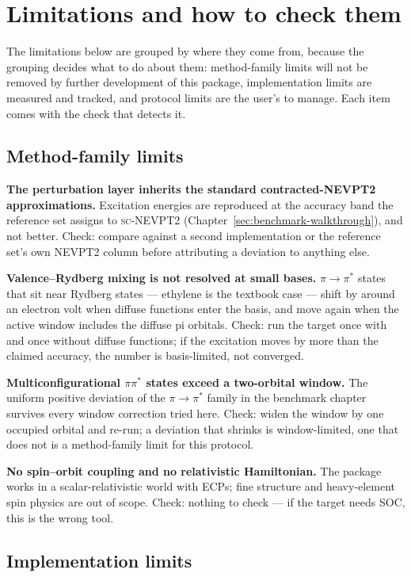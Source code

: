 \section{Limitations and how to check them}
\label{sec:limitations}

The limitations below are grouped by where they come from, because the
grouping decides what to do about them: method-family limits will not
be removed by further development of this package, implementation
limits are measured and tracked, and protocol limits are the user's to
manage.  Each item comes with the check that detects it.

\subsection{Method-family limits}

\textbf{The perturbation layer inherits the standard contracted-NEVPT2
approximations.}  Excitation energies are reproduced at the accuracy
band the reference set assigns to \textsc{sc}-NEVPT2
(Chapter~\ref{sec:benchmark-walkthrough}), and not better.  Check:
compare against a second implementation or the reference set's own
NEVPT2 column before attributing a deviation to anything else.

\textbf{Valence--Rydberg mixing is not resolved at small bases.}
$\pi \to \pi^*$ states that sit near Rydberg states --- ethylene is the
textbook case --- shift by around an electron volt when diffuse
functions enter the basis, and move again when the active window
includes the diffuse pi orbitals.  Check: run the target once with and
once without diffuse functions; if the excitation moves by more than
the claimed accuracy, the number is basis-limited, not converged.

\textbf{Multiconfigurational $\pi\pi^*$ states exceed a two-orbital
window.}  The uniform positive deviation of the $\pi \to \pi^*$ family
in the benchmark chapter survives every window correction tried here.
Check: widen the window by one occupied orbital and re-run; a
deviation that shrinks is window-limited, one that does not is a
method-family limit for this protocol.

\textbf{No spin--orbit coupling and no relativistic Hamiltonian.}  The
package works in a scalar-relativistic world with ECPs; fine
structure and heavy-element spin physics are out of scope.  Check:
nothing to check --- if the target needs SOC, this is the wrong tool.

\subsection{Implementation limits}

